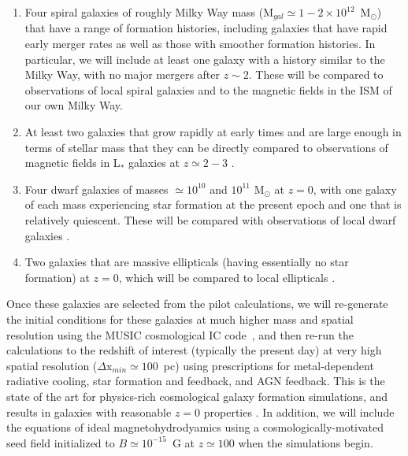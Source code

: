 \begin{enumerate}

\item Four spiral galaxies of roughly Milky Way mass (M$_{gal} \simeq 1-2 \times
10^{12}$~M$_\odot$) that have a range of formation histories,
including galaxies that have rapid early merger rates as well as those
with smoother formation histories.  In particular, we will include at least one galaxy
with a history similar to the Milky Way, with no major
mergers after $z \sim 2$.  These will be compared to observations of
local spiral galaxies \cite[e.g.,][]{2014arXiv1411.1386V} and to the
magnetic fields in the ISM of our own Milky Way.

\item At least two galaxies that grow rapidly at early times and are
large enough in terms of stellar mass that they can be directly compared to observations of magnetic fields
in L$_*$ galaxies at $z \simeq 2-3$
\cite[e.g.,][]{2008Natur.454..302B,2008ApJ...676...70K,1998A&A...329..809A}.

\item Four dwarf galaxies of masses $\simeq 10^{10}$ and $10^{11}$
M$_\odot$ at $z=0$, with one galaxy of each mass experiencing star formation
at the present epoch and one that is relatively quiescent.  These will be compared with
observations of local dwarf galaxies
\cite{2000A&A...355..128C,2011A&A...529A..94C,2012MNRAS.423L.127R,Mao12,2013MNRAS.435..149N,2014A&A...567A.134J}.

\item Two galaxies that are massive ellipticals (having essentially no
star formation) at $z=0$, which will be compared to local ellipticals
\cite{1993A&ARv...4..449W,1996MNRAS.279..229M}.

\end{enumerate}

Once these galaxies are selected from the pilot calculations, we will re-generate the initial
conditions for these galaxies at much higher mass and spatial
resolution using the MUSIC cosmological IC
code~\cite{2011MNRAS.415.2101H}, and then re-run the calculations to
the redshift of interest (typically the present day) at very high
spatial resolution ($\Delta \mathrm{x}_{min} \simeq 100$~pc) using
prescriptions for metal-dependent radiative cooling, star formation
and feedback, and AGN feedback.  This is the state of the art for
physics-rich cosmological galaxy formation simulations, and results in
galaxies with reasonable $z=0$ properties
\cite[e.g.,][]{2012MNRAS.423.1726S,2014MNRAS.444.1518V,2014MNRAS.445..581H}.
In addition, we will include the equations of ideal
magnetohydrodyamics using a cosmologically-motivated seed field
initialized to $B
\simeq 10^{-15}$~G at $z \simeq 100$ when the simulations begin.

